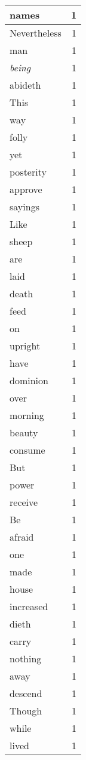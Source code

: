 \begin{center}
\begin{longtable}{l|r}
names & 1 \\ \hline
Nevertheless & 1 \\ \hline
man & 1 \\ \hline
\emph{being} & 1 \\ \hline
abideth & 1 \\ \hline
This & 1 \\ \hline
way & 1 \\ \hline
folly & 1 \\ \hline
yet & 1 \\ \hline
posterity & 1 \\ \hline
approve & 1 \\ \hline
sayings & 1 \\ \hline
Like & 1 \\ \hline
sheep & 1 \\ \hline
are & 1 \\ \hline
laid & 1 \\ \hline
death & 1 \\ \hline
feed & 1 \\ \hline
on & 1 \\ \hline
upright & 1 \\ \hline
have & 1 \\ \hline
dominion & 1 \\ \hline
over & 1 \\ \hline
morning & 1 \\ \hline
beauty & 1 \\ \hline
consume & 1 \\ \hline
But & 1 \\ \hline
power & 1 \\ \hline
receive & 1 \\ \hline
Be & 1 \\ \hline
afraid & 1 \\ \hline
one & 1 \\ \hline
made & 1 \\ \hline
house & 1 \\ \hline
increased & 1 \\ \hline
dieth & 1 \\ \hline
carry & 1 \\ \hline
nothing & 1 \\ \hline
away & 1 \\ \hline
descend & 1 \\ \hline
Though & 1 \\ \hline
while & 1 \\ \hline
lived & 1 \\ \hline

\end{longtable}
\end{center}
